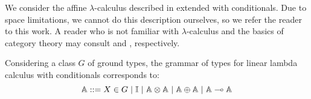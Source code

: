 \documentclass[a4paper,UKenglish,cleveref, autoref, thm-restate]{lipics-v2021}
\begin{document}
We consider the affine $\lambda$-calculus described in \cite[Sections 2.1, 3.2, 3.4, 5.1]{dahlqvist2023syntactic} extended with conditionals. 
Due to space limitations, we cannot do this description ourselves, so we refer the reader to this work.  
A reader who is not familiar with $\lambda$-calculus and the basics of category theory may consult \cite{croleCategoriesTypes1994, mackieLanguageAutonomous1993} and \cite{maclane13,barrCategoryTheoryComputing1990}, respectively.


Considering a class $G$ of ground types, the grammar of types for linear lambda calculus with conditionals corresponds to:
\begin{equation*} \label{eq:grammartypes}
   \mathbb{A} ::= X \in G \hspace{3 pt} \vert \hspace{3 pt} \mathbb{I} \hspace{3 pt}  \vert \hspace{3 pt} \mathbb{A}  \otimes  \mathbb{A} \hspace{3 pt} \vert  \hspace{3 pt} \mathbb{A}  \oplus \mathbb{A} \hspace{3 pt}  \vert  \hspace{3 pt} \mathbb{A} \multimap  \mathbb{A}
\end{equation*}
\end{document}
